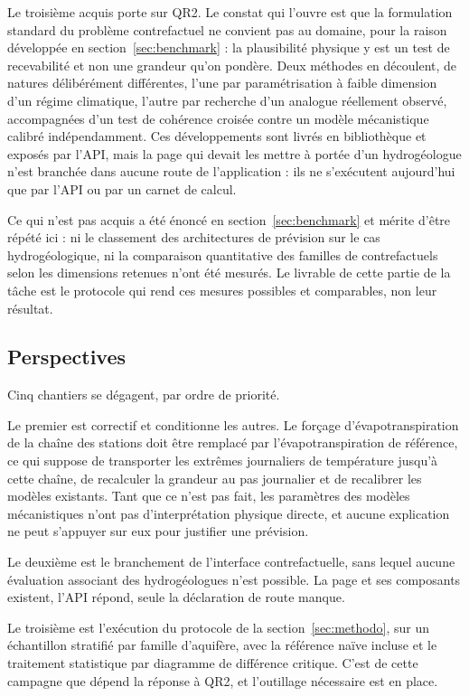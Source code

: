 Le troisième acquis porte sur QR2. Le constat qui l'ouvre est que la formulation standard du problème contrefactuel ne convient pas au domaine, pour la raison développée en section~\ref{sec:benchmark} : la plausibilité physique y est un test de recevabilité et non une grandeur qu'on pondère. Deux méthodes en découlent, de natures délibérément différentes, l'une par paramétrisation à faible dimension d'un régime climatique, l'autre par recherche d'un analogue réellement observé, accompagnées d'un test de cohérence croisée contre un modèle mécanistique calibré indépendamment. Ces développements sont livrés en bibliothèque et exposés par l'API, mais la page qui devait les mettre à portée d'un hydrogéologue n'est branchée dans aucune route de l'application : ils ne s'exécutent aujourd'hui que par l'API ou par un carnet de calcul.

Ce qui n'est pas acquis a été énoncé en section~\ref{sec:benchmark} et mérite d'être répété ici : ni le classement des architectures de prévision sur le cas hydrogéologique, ni la comparaison quantitative des familles de contrefactuels selon les dimensions retenues n'ont été mesurés. Le livrable de cette partie de la tâche est le protocole qui rend ces mesures possibles et comparables, non leur résultat.

\subsection*{Perspectives}

Cinq chantiers se dégagent, par ordre de priorité.

Le premier est correctif et conditionne les autres. Le forçage d'évapotranspiration de la chaîne des stations doit être remplacé par l'évapotranspiration de référence, ce qui suppose de transporter les extrêmes journaliers de température jusqu'à cette chaîne, de recalculer la grandeur au pas journalier et de recalibrer les modèles existants. Tant que ce n'est pas fait, les paramètres des modèles mécanistiques n'ont pas d'interprétation physique directe, et aucune explication ne peut s'appuyer sur eux pour justifier une prévision.

Le deuxième est le branchement de l'interface contrefactuelle, sans lequel aucune évaluation associant des hydrogéologues n'est possible. La page et ses composants existent, l'API répond, seule la déclaration de route manque.

Le troisième est l'exécution du protocole de la section~\ref{sec:methodo}, sur un échantillon stratifié par famille d'aquifère, avec la référence naïve incluse et le traitement statistique par diagramme de différence critique. C'est de cette campagne que dépend la réponse à QR2, et l'outillage nécessaire est en place.

